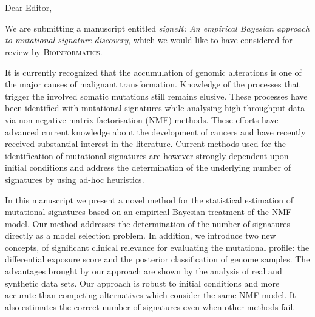 \documentclass[11pt,a4paper]{letter} %
\def\opening#1{\thispagestyle{empty}
{\centering\fromaddress \vspace{0.6in} \\ %
\hspace*{\longindentation}\hspace*{\fill}\par} %
{\raggedright \toname \\ \toaddress \par} %
\vspace{0.8in} %
\noindent #1 %
\def\thefootnote{}
\def\footnoterule{\hrule}
\footnotetext{\centering{\scriptsize {\textcolor{ACCgray}{Rua Tagu\'a, 440
 - Liberdade 01508-010 S\~ao Paulo, SP - Brazil $\star$ \phone\ $+$ 55 11
  21895000 $\star$ \FAX\ $+$ 55 11 21895017}}}}
\def\thefootnote{\arabic{footnote}}
}
\begin{document}

\begin{letter}
{}


\opening{Dear Editor,}

We are submitting a manuscript entitled \emph{signeR: An empirical Bayesian 
 approach to mutational signature discovery}, which we would like to
have considered for review by \textsc{Bioinformatics}. 

It is currently recognized that the accumulation of genomic
alterations is one of the major causes of malignant
transformation. Knowledge of the processes that trigger
the involved somatic mutations still remains elusive. These
processes have been identified with mutational signatures while
analysing high throughput data via non-negative matrix factorisation
(NMF) methods.  These efforts have advanced current knowledge about
the development of cancers and have recently received
substantial interest in the literature. Current methods used
for the identification of mutational signatures are however strongly
dependent upon initial conditions and address the determination of the 
underlying number of signatures by using ad-hoc heuristics.

In this manuscript we present a novel method for the statistical
estimation of mutational signatures based on an empirical Bayesian
treatment of the NMF model. Our method addresses the determination of
the number of signatures directly as a model selection problem. In
addition, we introduce two new concepts, of significant clinical
relevance for evaluating the mutational profile: the differential
exposure score and the posterior classification of genome samples. The
advantages brought by our approach are shown by the analysis of real
and synthetic data sets. Our approach is robust to initial conditions
and more accurate than competing alternatives which consider the same
NMF model. It also estimates the correct number of signatures even
when other methods fail.




\end{letter}
\end{document}
